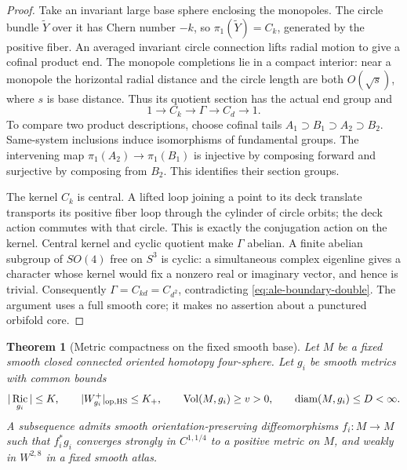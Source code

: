 \documentclass[11pt]{article}
\numberwithin{equation}{section}
\newtheorem{theorem}{Theorem}[section]
\theoremstyle{definition}
\theoremstyle{remark}
\DeclareMathOperator{\Ric}{Ric}
\DeclareMathOperator{\Vol}{Vol}
\begin{document}
\begin{proof}
Take an invariant large base sphere enclosing the monopoles.
The circle bundle \(\widetilde Y\) over it has Chern number
\(-k\), so \(\pi_1(\widetilde Y)=C_k\), generated by the
positive fiber. An averaged invariant circle connection lifts
radial motion to give a cofinal product end. The monopole
completions lie in a compact interior: near a monopole the
horizontal radial distance and the circle length are both
\(O(\sqrt{s})\), where \(s\) is base distance.
Thus its quotient section has the actual end group and
\[
 1\longrightarrow C_k\longrightarrow\Gamma
                      \longrightarrow C_d\longrightarrow1.
\]
To compare two product descriptions, choose cofinal tails
\(A_1\supset B_1\supset A_2\supset B_2\).
Same-system inclusions induce isomorphisms of fundamental groups.
The intervening map \(\pi_1(A_2)\to\pi_1(B_1)\) is injective
by composing forward and surjective by composing from \(B_2\).
This identifies their section groups.

The kernel \(C_k\) is central. A lifted loop joining a point
to its deck translate transports its positive fiber loop through
the cylinder of circle orbits; the deck action commutes with
that circle. This is exactly the conjugation action on the
kernel. Central kernel and cyclic quotient make \(\Gamma\)
abelian. A finite abelian subgroup of \(SO(4)\) free on
\(S^3\) is cyclic: a simultaneous complex eigenline gives a
character whose kernel would fix a nonzero real or imaginary
vector, and hence is trivial. Consequently
\(\Gamma=C_{kd}=C_{d^2}\), contradicting
\eqref{eq:ale-boundary-double}. The argument uses a full smooth
core; it makes no assertion about a punctured orbifold core.
\end{proof}

\begin{theorem}[Metric compactness on the fixed smooth base]
\label{thm:homotopy-metric-compactness}
Let \(M\) be a fixed smooth closed connected oriented homotopy
four-sphere. Let \(g_i\) be smooth metrics with common bounds
\begin{equation}\label{eq:homotopy-metric-bounds}
 |\Ric_{g_i}|\le K,\qquad |W^+_{g_i}|_{\rm op,HS}\le K_+,
 \qquad \Vol(M,g_i)\ge v>0,\qquad
 \operatorname{diam}(M,g_i)\le D<\infty.
\end{equation}
A subsequence admits smooth orientation-preserving diffeomorphisms
\(f_i:M\to M\) such that \(f_i^*g_i\) converges strongly in
\(C^{1,1/4}\) to a positive metric on \(M\), and weakly in
\(W^{2,8}\) in a fixed smooth atlas.
\end{theorem}
\end{document}
